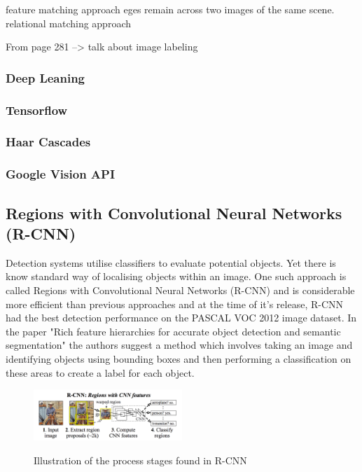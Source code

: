 \documentclass{mproj}
\begin{document}
feature matching approach
eges remain across two images of the same scene. 
relational matching approach

From page 281 --> talk about image labeling

\subsubsection{Deep Leaning}

  \subsubsection{Tensorflow}
  \subsubsection{Haar Cascades}
  \subsubsection{Google Vision API}

\subsection{Regions with Convolutional Neural Networks (R-CNN)}

Detection systems utilise classifiers to evaluate potential objects. Yet there is know standard way of localising objects within an image. One such approach is called Regions with Convolutional Neural Networks (R-CNN) and is considerable more efficient than previous approaches and at the time of it's release, R-CNN had the best detection performance on the PASCAL VOC 2012 image dataset. In the paper "Rich feature hierarchies for accurate object detection and semantic segmentation"\cite{Girshick2014} the authors suggest a method which involves taking an image and identifying objects using bounding boxes and then performing a classification on these areas to create a label for each object. 

\begin{figure}[h]
  \caption{Illustration of the process stages found in R-CNN}
  \centering
  \includegraphics[width=0.5\textwidth]{images/RCNN.png}
  \label{fig:RCNN Diagram}
\end{figure}
\end{document}
